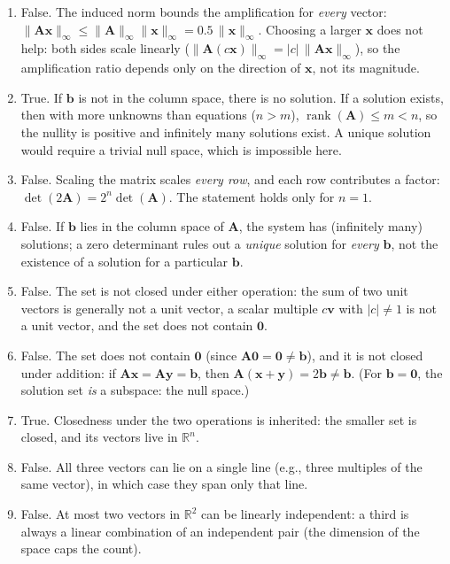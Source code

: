 \begin{solution}
\begin{enumerate}[label=(\alphalphenum*)]
        \item False. The induced norm bounds the amplification for \emph{every} vector: $\|\mathbf{A}\mathbf{x}\|_\infty \leq \|\mathbf{A}\|_\infty \|\mathbf{x}\|_\infty = 0.5\, \|\mathbf{x}\|_\infty$. Choosing a larger $\mathbf{x}$ does not help: both sides scale linearly ($\|\mathbf{A}(c\mathbf{x})\|_\infty = |c|\, \|\mathbf{A}\mathbf{x}\|_\infty$), so the amplification ratio depends only on the direction of $\mathbf{x}$, not its magnitude.
        \item True. If $\mathbf{b}$ is not in the column space, there is no solution. If a solution exists, then with more unknowns than equations ($n > m$), $\operatorname{rank}(\mathbf{A}) \leq m < n$, so the nullity is positive and infinitely many solutions exist. A unique solution would require a trivial null space, which is impossible here.
        \item False. Scaling the matrix scales \emph{every row}, and each row contributes a factor: $\det(2\mathbf{A}) = 2^n \det(\mathbf{A})$. The statement holds only for $n = 1$.
        \item False. If $\mathbf{b}$ lies in the column space of $\mathbf{A}$, the system has (infinitely many) solutions; a zero determinant rules out a \emph{unique} solution for \emph{every} $\mathbf{b}$, not the existence of a solution for a particular $\mathbf{b}$.
        \item False. The set is not closed under either operation: the sum of two unit vectors is generally not a unit vector, a scalar multiple $c\mathbf{v}$ with $|c| \neq 1$ is not a unit vector, and the set does not contain $\mathbf{0}$.
        \item False. The set does not contain $\mathbf{0}$ (since $\mathbf{A}\mathbf{0} = \mathbf{0} \neq \mathbf{b}$), and it is not closed under addition: if $\mathbf{A}\mathbf{x} = \mathbf{A}\mathbf{y} = \mathbf{b}$, then $\mathbf{A}(\mathbf{x} + \mathbf{y}) = 2\mathbf{b} \neq \mathbf{b}$. (For $\mathbf{b} = \mathbf{0}$, the solution set \emph{is} a subspace: the null space.)
        \item True. Closedness under the two operations is inherited: the smaller set is closed, and its vectors live in $\mathbb{R}^n$.
        \item False. All three vectors can lie on a single line (e.g., three multiples of the same vector), in which case they span only that line.
        \item False. At most two vectors in $\mathbb{R}^2$ can be linearly independent: a third is always a linear combination of an independent pair (the dimension of the space caps the count).

\end{enumerate}
\end{solution}
